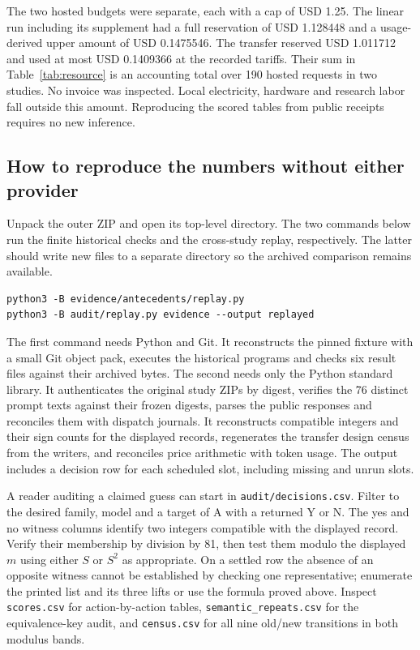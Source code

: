\documentclass[12pt,letterpaper]{article}
\begin{document}
The two hosted budgets were separate, each with a cap of USD 1.25. The linear run including its supplement had a full reservation of USD 1.128448 and a usage-derived upper amount of USD 0.1475546. The transfer reserved USD 1.011712 and used at most USD 0.1409366 at the recorded tariffs. Their sum in Table~\ref{tab:resource} is an accounting total over 190 hosted requests in two studies. No invoice was inspected. Local electricity, hardware and research labor fall outside this amount. Reproducing the scored tables from public receipts requires no new inference.

\subsection{How to reproduce the numbers without either provider}
Unpack the outer ZIP and open its top-level directory. The two commands below run the finite historical checks and the cross-study replay, respectively. The latter should write new files to a separate directory so the archived comparison remains available.
\begin{verbatim}
python3 -B evidence/antecedents/replay.py
python3 -B audit/replay.py evidence --output replayed
\end{verbatim}
The first command needs Python and Git. It reconstructs the pinned fixture with a small Git object pack, executes the historical programs and checks six result files against their archived bytes. The second needs only the Python standard library. It authenticates the original study ZIPs by digest, verifies the 76 distinct prompt texts against their frozen digests, parses the public responses and reconciles them with dispatch journals. It reconstructs compatible integers and their sign counts for the displayed records, regenerates the transfer design census from the writers, and reconciles price arithmetic with token usage. The output includes a decision row for each scheduled slot, including missing and unrun slots.

A reader auditing a claimed guess can start in \texttt{audit/decisions.csv}. Filter to the desired family, model and a target of A with a returned Y or N. The yes and no witness columns identify two integers compatible with the displayed record. Verify their membership by division by 81, then test them modulo the displayed $m$ using either $S$ or $S^2$ as appropriate. On a settled row the absence of an opposite witness cannot be established by checking one representative; enumerate the printed list and its three lifts or use the formula proved above. Inspect \texttt{scores.csv} for action-by-action tables, \texttt{semantic\_repeats.csv} for the equivalence-key audit, and \texttt{census.csv} for all nine old/new transitions in both modulus bands.
\end{document}
